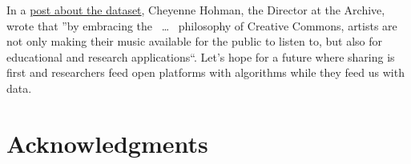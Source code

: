 \documentclass{article}
\begin{document}
In a \href{https://freemusicarchive.org/member/cheyenne_h/blog/FMA_Dataset_for_Researchers}{post about the dataset}, Cheyenne Hohman, the Director at the Archive, wrote that ''by embracing the
~\ldots~%
philosophy of Creative Commons, artists are not only making their music available for the public to listen to, but also for educational and research applications``.
Let's hope for a future where sharing is first and researchers feed open platforms with algorithms while they feed us with data.


\section{Acknowledgments}



\end{document}
